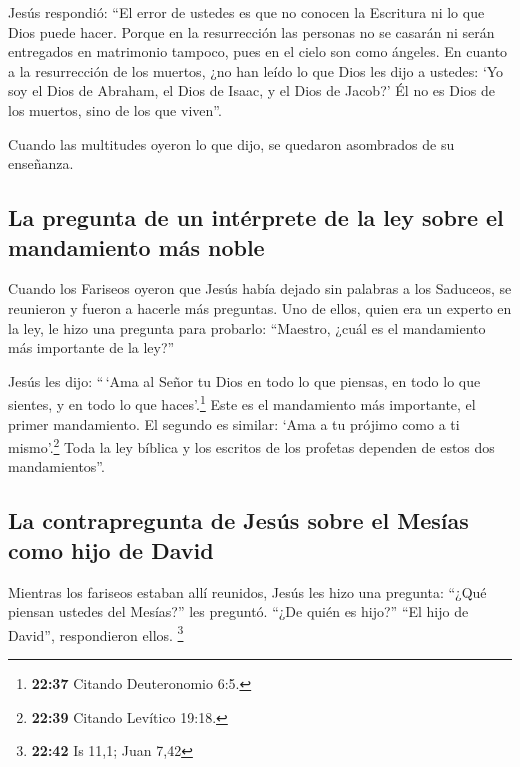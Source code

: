  Jesús respondió: ``El error de ustedes es que no conocen
la Escritura ni lo que Dios puede hacer.  Porque en la
resurrección las personas no se casarán ni serán entregados en
matrimonio tampoco, pues en el cielo son como ángeles. 
En cuanto a la resurrección de los muertos, ¿no han leído lo que Dios
les dijo a ustedes:  `Yo soy el Dios de Abraham, el Dios
de Isaac, y el Dios de Jacob?' Él no es Dios de los muertos, sino de los
que viven''.

 Cuando las multitudes oyeron lo que dijo, se quedaron
asombrados de su enseñanza.

\hypertarget{la-pregunta-de-un-intuxe9rprete-de-la-ley-sobre-el-mandamiento-muxe1s-noble}{%
\subsection{La pregunta de un intérprete de la ley sobre el mandamiento
más
noble}\label{la-pregunta-de-un-intuxe9rprete-de-la-ley-sobre-el-mandamiento-muxe1s-noble}}

 Cuando los Fariseos oyeron que Jesús había dejado sin
palabras a los Saduceos, se reunieron y fueron a hacerle más preguntas.
 Uno de ellos, quien era un experto en la ley, le hizo
una pregunta para probarlo:  ``Maestro, ¿cuál es el
mandamiento más importante de la ley?''

 Jesús les dijo: ``\,`Ama al Señor tu Dios en todo lo que
piensas, en todo lo que sientes, y en todo lo que haces'.\footnote{\textbf{22:37}
  Citando Deuteronomio 6:5.}  Este es el mandamiento más
importante, el primer mandamiento.  El segundo es
similar: `Ama a tu prójimo como a ti mismo'.\footnote{\textbf{22:39}
  Citando Levítico 19:18.}  Toda la ley bíblica y los
escritos de los profetas dependen de estos dos mandamientos''.

\hypertarget{la-contrapregunta-de-jesuxfas-sobre-el-mesuxedas-como-hijo-de-david}{%
\subsection{La contrapregunta de Jesús sobre el Mesías como hijo de
David}\label{la-contrapregunta-de-jesuxfas-sobre-el-mesuxedas-como-hijo-de-david}}

 Mientras los fariseos estaban allí reunidos, Jesús les
hizo una pregunta:  ``¿Qué piensan ustedes del Mesías?''
les preguntó. ``¿De quién es hijo?'' ``El hijo de David'', respondieron
ellos. \footnote{\textbf{22:42} Is 11,1; Juan 7,42}

